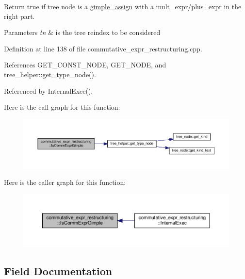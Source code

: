 Return true if tree node is a \hyperlink{structgimple__assign}{gimple\+\_\+assign} with a mult\+\_\+expr/plus\+\_\+expr in the right part. 


\begin{DoxyParams}{Parameters}
{\em tn} & is the tree reindex to be considered \\
\hline
\end{DoxyParams}


Definition at line 138 of file commutative\+\_\+expr\+\_\+restructuring.\+cpp.



References G\+E\+T\+\_\+\+C\+O\+N\+S\+T\+\_\+\+N\+O\+DE, G\+E\+T\+\_\+\+N\+O\+DE, and tree\+\_\+helper\+::get\+\_\+type\+\_\+node().



Referenced by Internal\+Exec().

Here is the call graph for this function\+:
\nopagebreak
\begin{figure}[H]
\begin{center}
\leavevmode
\includegraphics[width=350pt]{db/d8c/classcommutative__expr__restructuring_a9eb19b39bada4a7aa58b2a479e778c16_cgraph}
\end{center}
\end{figure}
Here is the caller graph for this function\+:
\nopagebreak
\begin{figure}[H]
\begin{center}
\leavevmode
\includegraphics[width=350pt]{db/d8c/classcommutative__expr__restructuring_a9eb19b39bada4a7aa58b2a479e778c16_icgraph}
\end{center}
\end{figure}


\subsection{Field Documentation}
\mbox{\label{classcommutative__expr__restructuring_a0361afa8ec9f530d6f712270b6ce92f4}} 
